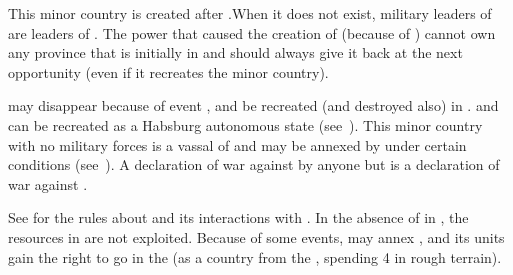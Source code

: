  \hfill {}
\bparag This minor country is created after .When it does not exist, military leaders of
 are leaders of .
\bparag The power that caused the creation of 
(because of ) cannot own any province that
is initially in  and should always give it back at the 
next opportunity (even if it recreates the minor country).

 \hfill {}
\bparag \paysBoheme may disappear because of event , and be recreated (and destroyed also) in
.
\aparag {} and  can be recreated as a Habsburg
autonomous state (see~).
 This minor country with no military
forces is a vassal of \POL and may be annexed by \POL under certain
conditions (see~). A declaration of war
against  by anyone but \POL is a declaration of war
against \POL.


\label{chSpecific:Persia}
\bparag See  for the rules about 
and its interactions with . In the absence of \TP in
, the resources in  are not exploited.
\bparag Because of some events,  may annex
, and its units gain the right to go in the
\ROTW (as a country from the \ROTW, spending 4 \MP in rough terrain).


